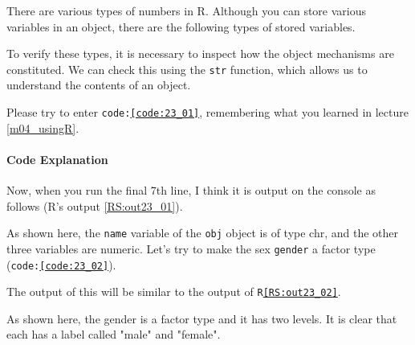 \documentclass{ltjbook}
\begin{document}
There are various types of numbers in R. Although you can store various variables in an object, there are the following types of stored variables.

To verify these types, it is necessary to inspect how the object mechanisms are constituted. We can check this using the \texttt{str} function, which allows us to understand the contents of an object.

Please try to enter \texttt{code:\ref{code:23_01}}, remembering what you learned in lecture \ref{m04_usingR}.

\paragraph{Code Explanation}


Now, when you run the final 7th line, I think it is output on the console as follows (R's output \ref{RS:out23_01}).

As shown here, the \texttt{name} variable of the \texttt{obj} object is of type chr, and the other three variables are numeric. Let's try to make the sex \texttt{gender} a factor type (\texttt{code:\ref{code:23_02}}).



The output of this will be similar to the output of \texttt{R\ref{RS:out23_02}}.

As shown here, the gender is a factor type and it has two levels. It is clear that each has a label called "male" and "female".
\end{document}
